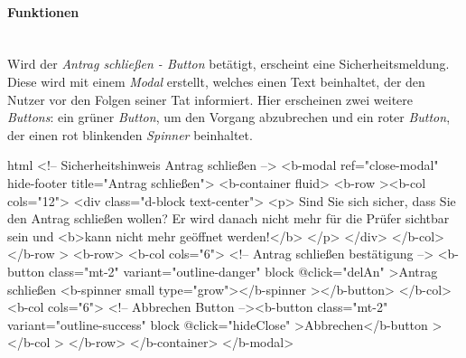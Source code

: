 \paragraph{Funktionen}
~\\
Wird der \textit{Antrag schließen - Button} betätigt, erscheint eine Sicherheitsmeldung. Diese wird mit einem \textit{Modal} erstellt, welches einen Text beinhaltet, der den Nutzer vor den Folgen seiner Tat informiert. Hier erscheinen zwei weitere \textit{Buttons}: ein grüner \textit{Button}, um den Vorgang abzubrechen und ein roter \textit{Button}, der einen rot blinkenden \textit{Spinner} beinhaltet.
\begin{code}{html}
	<!-- Sicherheitshinweis Antrag schließen -->
    <b-modal ref="close-modal" hide-footer title="Antrag schließen">
      <b-container fluid>
        <b-row
          ><b-col cols="12">
            <div class="d-block text-center">
              <p>
                Sind Sie sich sicher, dass Sie den Antrag schließen wollen? Er
                wird danach nicht mehr für die Prüfer sichtbar sein und
                <b>kann nicht mehr geöffnet werden!</b>
              </p>
            </div>
          </b-col></b-row
        >
        <b-row>
          <b-col cols="6">
            <!-- Antrag schließen bestätigung -->
            <b-button class="mt-2" variant="outline-danger" block @click="delAn"
              >Antrag schließen <b-spinner small type="grow"></b-spinner
            ></b-button>
          </b-col>
          <b-col cols="6">
            <!-- Abbrechen Button --><b-button
              class="mt-2"
              variant="outline-success"
              block
              @click="hideClose"
              >Abbrechen</b-button
            ></b-col
          >
        </b-row>
      </b-container>
    </b-modal>
\end{code}
	\label{list:securityalert} ~\\
~\\

\newpage
